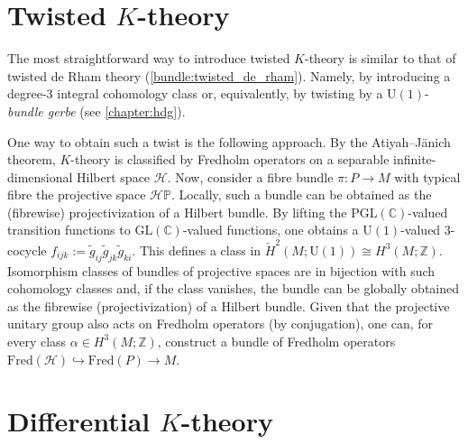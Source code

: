 \section{\texorpdfstring{Twisted $K$-theory}{Twisted K-theory}}\label{section:twisted_k_theory}

    The most straightforward way to introduce twisted $K$-theory is similar to that of twisted de Rham theory (\cref{bundle:twisted_de_rham}). Namely, by introducing a degree-3 integral cohomology class or, equivalently, by twisting by a $\mathrm{U}(1)$-\textit{bundle gerbe} (see \cref{chapter:hdg}).

    One way to obtain such a twist is the following approach. By the Atiyah--J\"anich theorem, $K$-theory is classified by Fredholm operators on a separable infinite-dimensional Hilbert space $\mathcal{H}$. Now, consider a fibre bundle $\pi:P\rightarrow M$ with typical fibre the projective space $\mathcal{H}\mathbb{P}$. Locally, such a bundle can be obtained as the (fibrewise) projectivization of a Hilbert bundle. By lifting the $\mathrm{PGL}(\mathbb{C})$-valued transition functions to $\mathrm{GL}(\mathbb{C})$-valued functions, one obtains a $\mathrm{U}(1)$-valued 3-cocycle $f_{ijk}:=\widetilde{g}_{ij}\widetilde{g}_{jk}\widetilde{g}_{ki}$. This defines a class in $\check{H}^2(M;\mathrm{U}(1))\cong H^3(M;\mathbb{Z})$. Isomorphism classes of bundles of projective spaces are in bijection with such cohomology classes and, if the class vanishes, the bundle can be globally obtained as the fibrewise (projectivization) of a Hilbert bundle. Given that the projective unitary group also acts on Fredholm operators (by conjugation), one can, for every class $\alpha\in H^3(M;\mathbb{Z})$, construct a bundle of Fredholm operators $\mathrm{Fred}(\mathcal{H})\hookrightarrow\mathrm{Fred}(P)\rightarrow M$.


\section{\texorpdfstring{Differential $K$-theory}{Differential K-theory}}

